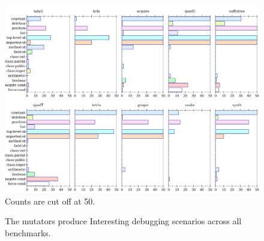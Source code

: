 \begin{figure} \footnotesize
 \centering
 \includegraphics[scale=0.33]{./plots/mutant-breakdown}
  Counts are cut off at 50.

\caption{The mutators produce Interesting debugging scenarios across all benchmarks.} 
 \label{fig:mutant-breakdown}
\end{figure}

